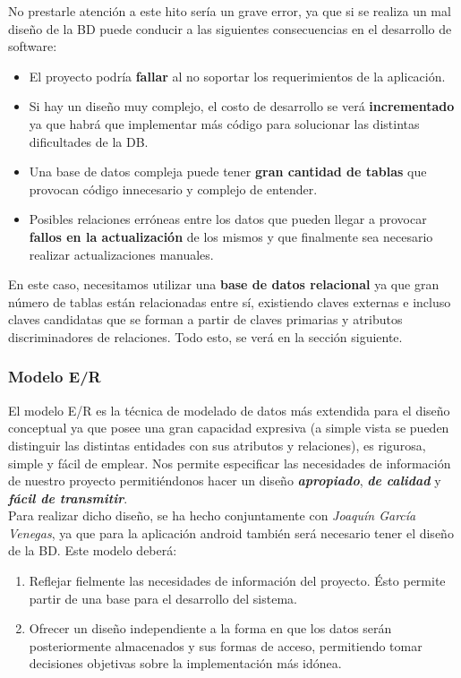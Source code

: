 No prestarle atención a este hito sería un grave error, ya que si se realiza un mal diseño
de la BD puede conducir a las siguientes consecuencias en el desarrollo de software:

    \begin{itemize}
        \item El proyecto podría \textbf{fallar} al no soportar los requerimientos de la
        aplicación.
        \item Si hay un diseño muy complejo, el costo de desarrollo se verá
        \textbf{incrementado} ya que habrá que implementar más código para solucionar las
        distintas dificultades de la DB.
        \item Una base de datos compleja puede tener \textbf{gran cantidad de tablas} que 
        provocan código innecesario y complejo de entender.
        \item Posibles relaciones erróneas entre los datos que pueden llegar a provocar
        \textbf{fallos en la actualización} de los mismos y que finalmente sea necesario realizar
        actualizaciones manuales.
    \end{itemize}

En este caso, necesitamos utilizar una \textbf{base de datos relacional} ya que gran número
de tablas están relacionadas entre sí, existiendo claves externas e incluso claves
candidatas que se forman a partir de claves primarias y atributos discriminadores de
relaciones. Todo esto, se verá en la sección siguiente.

    \subsubsection{Modelo E/R}
    El modelo E/R es la técnica de modelado de datos más extendida para el diseño
    conceptual ya que posee una gran capacidad expresiva (a simple vista se pueden
    distinguir las distintas entidades con sus atributos y relaciones), es rigurosa, simple
    y fácil de emplear. Nos permite especificar las necesidades de información de nuestro
    proyecto permitiéndonos hacer un diseño \textbf{\textit{apropiado}},
    \textbf{\textit{de calidad}} y \textbf{\textit{fácil de transmitir}}.\\

    Para realizar dicho diseño, se ha hecho conjuntamente con \textit{Joaquín García 
    Venegas}, ya que para la aplicación android también será necesario tener el diseño de la
    BD. Este modelo deberá:

        \begin{enumerate}
            \item Reflejar fielmente las necesidades de información del proyecto. Ésto permite
            partir de una base para el desarrollo del sistema.
            \item Ofrecer un diseño independiente a la forma en que los datos serán
            posteriormente almacenados y sus formas de acceso, permitiendo tomar decisiones
            objetivas sobre la implementación más idónea.
        \end{enumerate}

